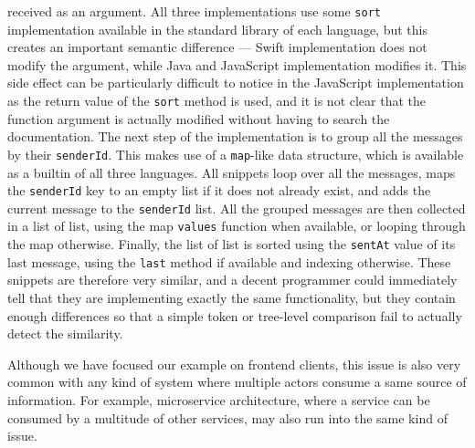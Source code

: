 received as an argument. All three implementations use some \lstinline{sort}
implementation available in the standard library of each language, but this
creates an important semantic difference --- Swift implementation does not
modify the argument, while Java and JavaScript implementation modifies it. This
side effect can be particularly difficult to notice in the JavaScript
implementation as the return value of the \lstinline{sort} method is used, and
it is not clear that the function argument is actually modified without having
to search the documentation. The next step of the implementation is to group all
the messages by their \lstinline{senderId}. This makes use of a
\lstinline{map}-like data structure, which is available as a builtin of all
three languages. All snippets loop over all the messages, maps the
\lstinline{senderId} key to an empty list if it does not already exist, and adds
the current message to the \lstinline{senderId} list. All the grouped messages
are then collected in a list of list, using the map \lstinline{values} function
when available, or looping through the map otherwise. Finally, the list of list
is sorted using the \lstinline{sentAt} value of its last message, using the
\lstinline{last} method if available and indexing otherwise. These snippets are
therefore very similar, and a decent programmer could immediately tell that they
are implementing exactly the same functionality, but they contain enough
differences so that a simple token or tree-level comparison fail to actually
detect the similarity.

Although we have focused our example on frontend clients, this issue is also
very common with any kind of system where multiple actors consume a same source
of information. For example, microservice architecture, where a service can be
consumed by a multitude of other services, may also run into the same kind of
issue.

